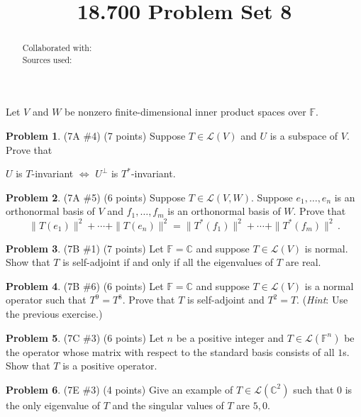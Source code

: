 \documentclass[reqno, 12pt]{amsart}
\theoremstyle{definition}
\newenvironment{problab}[1]
{\noindent\textbf{Problem #1}.}
{\vskip 6pt}
\theoremstyle{remark}
\newtheorem*{soln}{Solution}
\newcommand{\C}{\mathbb C}
\newcommand{\F}{\mathbb F}
\renewcommand{\L}{\mathcal L}
\renewcommand{\abstractname}{}    %
\begin{document}

\title{18.700 Problem Set 8}

\maketitle

\begin{abstract}
  \noindent Collaborated with:\\
  Sources used: 
\end{abstract}
\vskip 0.5cm

Let $V$ and $W$ be nonzero finite-dimensional inner product spaces over $\F$.
\vskip 0.5cm

\begin{problab}{1} (7A \#4) (7 points)
  Suppose $T \in \L(V)$ and $U$ is a subspace of $V$. Prove that
  \begin{center}
    $U$ is $T$-invariant $\iff$ $U^\perp$ is $T^*$-invariant.
  \end{center}
\end{problab}


\begin{problab}{2} (7A \#5) (6 points)
  Suppose $T \in \L(V,W)$. Suppose $e_1, \ldots, e_n$ is an orthonormal basis of $V$ and $f_1, \ldots, f_m$ is an orthonormal basis of $W$. Prove that
  \begin{equation*}
    \|T(e_1)\|^2 + \cdots + \|T(e_n)\|^2 = \|T^*(f_1)\|^2 + \cdots + \|T^*(f_m)\|^2 \, .
  \end{equation*}
\end{problab}

\begin{problab}{3} (7B \#1) (7 points)
  Let $\F = \C$ and suppose $T \in \L(V)$ is normal. Show that $T$ is self-adjoint if and only if all the eigenvalues of $T$ are real.
\end{problab}

\begin{problab}{4} (7B \#6) (6 points)
  Let $\F = \C$ and suppose $T \in \L(V)$ is a normal operator such that $T^9 = T^8$. Prove that $T$ is self-adjoint and $T^2 = T$. (\textit{Hint}: Use the previous exercise.)
\end{problab}

\begin{problab}{5} (7C \#3) (6 points)
  Let $n$ be a positive integer and $T \in \L(\F^n)$ be the operator whose matrix with respect to the standard basis consists of all $1$s. Show that $T$ is a positive operator.
\end{problab}

\begin{problab}{6} (7E \#3) (4 points)
  Give an example of $T \in \L(\C^2)$ such that $0$ is the only eigenvalue of $T$ and the singular values of $T$ are $5,0$.
\end{problab}
\end{document}
